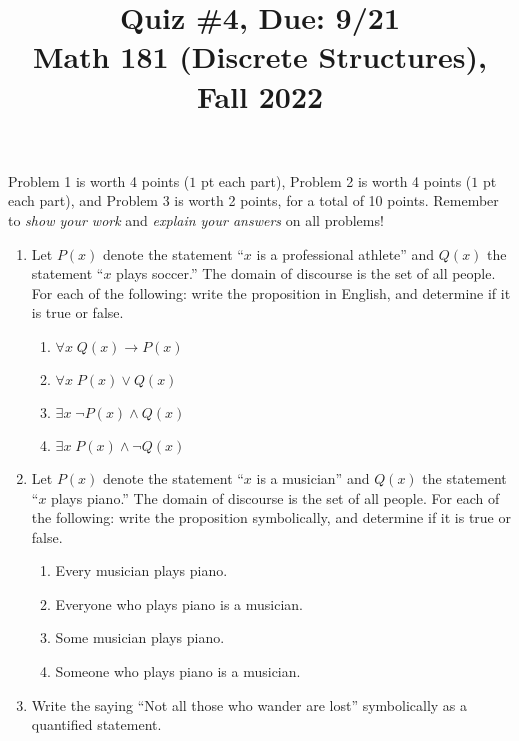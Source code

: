 \documentclass[11pt]{article}
\title{Quiz \#4, Due: 9/21 \\Math 181 (Discrete Structures), Fall 2022}
\date{}
\begin{document}
\maketitle

\thispagestyle{empty}

\vspace{-1cm}

Problem 1 is worth 4 points ($1$ pt each part), Problem 2 is worth 4 points ($1$ pt each part),  and Problem 3 is worth 2 points, for a total of 10 points. Remember to \emph{show your work} and \emph{explain your answers} on all problems!

\begin{enumerate}
\item Let $P(x)$ denote the statement ``$x$ is a professional athlete'' and $Q(x)$ the statement ``$x$ plays soccer.'' The domain of discourse is the set of all people. For each of the following: write the proposition in English, and determine if it is true or false.
\begin{enumerate}
\item $\forall x \; Q(x) \to P(x)$
\item $\forall x \; P(x) \vee Q(x)$
\item $\exists x \; \neg P(x) \wedge Q(x)$
\item $\exists x \; P(x) \wedge \neg Q(x)$
\end{enumerate}

\item Let $P(x)$ denote the statement ``$x$ is a musician'' and $Q(x)$ the statement ``$x$ plays piano.'' The domain of discourse is the set of all people. For each of the following: write the proposition symbolically, and determine if it is true or false.
\begin{enumerate}
\item Every musician plays piano.
\item Everyone who plays piano is a musician.
\item Some musician plays piano.
\item Someone who plays piano is a musician.
\end{enumerate}

\item Write the saying ``Not all those who wander are lost'' symbolically as a quantified statement.

\end{enumerate}
\end{document}
